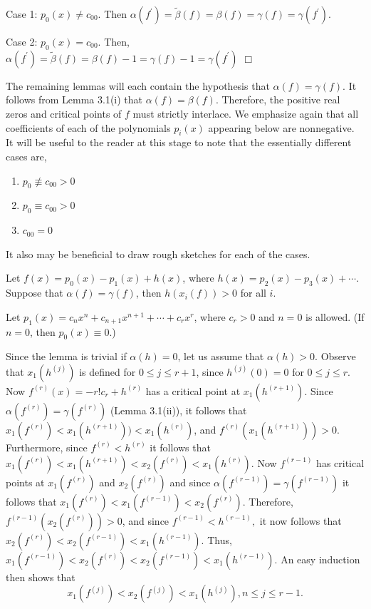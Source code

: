 Case 1: $p_0(x) \neq c_{00}$.  Then $\alpha (f^\prime) =
\tilde{\beta}(f) = \beta(f) = \gamma (f) = \gamma (f^{'})$. 

Case 2: $p_0 (x) = c_{00}$.  Then, $\alpha (f^{'}) = \tilde{\beta}
(f) = \beta(f) - 1 = \gamma (f) - 1 = \gamma (f^{'})$ $\Box$


\begin{remark}  The remaining lemmas will each contain
the hypothesis that $\alpha (f) = \gamma (f)$.  It follows from Lemma
3.1(i) that $\alpha (f) = \beta (f)$.  Therefore, the positive real
zeros and critical points of $f$ must strictly interlace. We
emphasize again that all coefficients of each of the polynomials
$p_{i} (x)$ appearing below are nonnegative. It will be useful to
the reader at this stage to note that the essentially different
cases are,

\begin{enumerate}

\item[(i)] $p_{0} \not\equiv c_{00} > 0$

\item[(ii)] $p_{0} \equiv c_{00} > 0 $

\item[(iii)] $c_{00} = 0$

\end{enumerate} It also may be beneficial to draw rough sketches for
each of the cases.  \end{remark}

\begin{lemma}  Let $f(x) = p_0 (x) - p_1 (x) + h(x)$, where $h(x) =
p_2(x) - p_3 (x) + \cdots$.  Suppose that $\alpha (f) = \gamma (f)$,
then $h(x_i (f)) > 0$ for all $i$.\end{lemma}

  Let $p_1 (x) = c_n x^n + c_{n+1} x^{n+1} +
\cdots + c_r x^r$, where $c_r > 0$ and $n=0$ is allowed.  (If $n=0$,
then $p_0 (x) \equiv 0$.)

Since the lemma is trivial if $\alpha (h) = 0$, let us assume that
$\alpha (h) > 0$.  Observe that $x_1 (h^{(j)})$ is defined for $0
\leq j \leq r+1$, since $h^{(j)} (0) =0$ for $0 \leq j \leq r$.  Now
$f^{(r)} (x) = -r! c_r + h^{(r)}$ has a critical point at $x_1
(h^{(r+1)})$.  Since $\alpha (f^{(r)}) = \gamma (f^{(r)})$ (Lemma
3.1(ii)), it follows that $x_1 (f^{(r)}) < x_1 (h^{(r+1)})) < x_1
(h^{(r)})$, and $f^{(r)} (x_1 (h^{(r+1)})) > 0$.  Furthermore, since
$f^{(r)} < h^{(r)}$ it follows that $x_1 (f^{(r)}) < x_1 (h^{(r+1)}) <
x_2 (f^{(r)}) < x_1 (h^{(r)})$.  Now $f^{(r-1)}$ has critical points
at $x_1(f^{(r)})$ and $x_2(f^{(r)})$ and since $\alpha (f^{(r-1)}) =
\gamma(f^{(r-1)})$ it follows that $x_1 (f^{(r)}) < x_1 (f^{(r-1)}) <
x_2(f^{(r)})$.  Therefore, $f^{(r-1)} (x_2(f^{(r)})) > 0$, and since
$f^{(r-1)} < h^{(r-1)},$ it now follows that $x_2(f^{(r)}) <
x_2(f^{(r-1)}) < x_1(h^{(r-1)}).$ Thus, $x_{1} ( f^{(r-1)} ) < x_{2}
( f^{(r)} ) < x_{2} ( f^{(r-1)} ) < x_{1} ( h^{(r-1)}).$  An easy
induction then shows that $$x_1(f^{(j)}) < x_2(f^{(j)}) <
x_1(h^{(j)}), n\leq j \leq r-1.$$ 

